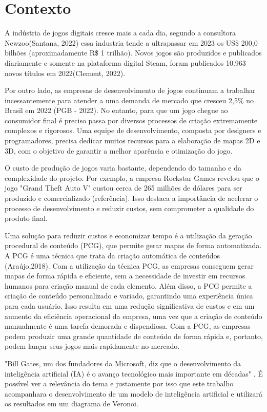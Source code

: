 \documentclass[
	12pt,				%
	openright,			%
	twoside,			%
	a4paper,			%
	english,			%
	french,				%
	spanish,			%
	brazil				%
	]{abntex2}
\begin{document}
\section{Contexto}

A indústria de jogos digitais cresce mais a cada dia, segundo a consultora Newzoo(Santana, 2022) essa industria tende a ultrapassar em 2023 os US\$ 200,0 bilhões (aproximadamente R\$ 1 trilhão). Novos jogos são produzidos e publicados diariamente e somente na plataforma digital Steam, foram publicados 10.963 novos títulos em 2022(Clement, 2022).

Por outro lado, as empresas de desenvolvimento de jogos continuam a trabalhar incessantemente para atender a uma demanda de mercado que cresceu 2,5\% no Brasil em 2022 
(PGB - 2022). No entanto, para que um jogo chegue ao consumidor final é preciso passa por diversos processos de criação extremamente complexos e rigorosos. Uma equipe de desenvolvimento, composta por designers e programadores, precisa dedicar muitos recursos para a elaboração de mapas 2D e 3D, com o objetivo de garantir a melhor aparência e otimização do jogo.

O custo de produção de jogos varia bastante, dependendo do tamanho e da complexidade do projeto. Por exemplo, a empresa Rockstar Games revelou que o jogo "Grand Theft Auto V" custou cerca de 265 milhões de dólares para ser produzido e comercializado (referência). Isso destaca a importância de acelerar o processo de desenvolvimento e reduzir custos, sem comprometer a qualidade do produto final.

Uma solução para reduzir custos e economizar tempo é a utilização da geração procedural de conteúdo (PCG), que permite gerar mapas de forma automatizada. A PCG é uma técnica que trata da criação automática de conteúdos (Araújo,2018). Com a utilização da técnica PCG, as empresas conseguem gerar mapas de forma rápida e eficiente, sem a necessidade de investir em recursos humanos para criação manual de cada elemento. Além disso, a PCG permite a criação de conteúdo personalizado e variado, garantindo uma experiência única para cada usuário. Isso resulta em uma redução significativa de custos e em um aumento da eficiência operacional da empresa, uma vez que a criação de conteúdo manualmente é uma tarefa demorada e dispendiosa. Com a PCG, as empresas podem produzir uma grande quantidade de conteúdo de forma rápida e, portanto, podem lançar seus jogos mais rapidamente no mercado.

"Bill Gates, um dos fundadores da Microsoft, diz que o desenvolvimento da inteligência artificial (IA) é o avanço tecnológico mais importante em décadas"\space
\cite{inteligencia_artificial_e_avanco_bbc}. É possível ver
a relevância do tema e justamente por isso que este trabalho acompanhara o desenvolvimento
de um modelo de inteligência artificial e utilizará os resultados em um diagrama de Veronoi.
\end{document}
